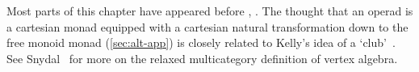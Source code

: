 \begin{notes}

Most parts of this chapter have appeared before \cite[\S 4]{GOM},
\cite[Ch.~3]{OHDCT}.  The thought that an operad is a cartesian monad
equipped with a cartesian natural transformation down to the free monoid
monad (\ref{sec:alt-app}) is closely related to Kelly's%
%
%
idea of a
`club'~\cite{KelCD, KelCDC}.%
%
%
 See Snydal~\cite{SnyEBG, SnyRMC}%
%
%
for more on
the relaxed multicategory definition of vertex algebra.


\end{notes}
